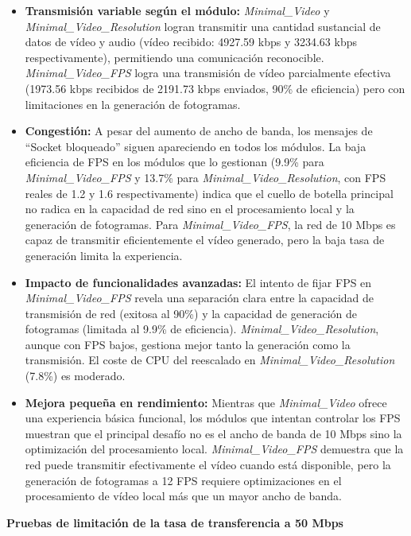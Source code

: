 \begin{itemize}
\item \textbf{Transmisión variable según el módulo:} \textit{Minimal\_Video} y \textit{Minimal\_Video\_Resolution} logran transmitir una cantidad sustancial de datos de vídeo y audio (vídeo recibido: 4927.59 kbps y 3234.63 kbps respectivamente), permitiendo una comunicación reconocible. \textit{Minimal\_Video\_FPS} logra una transmisión de vídeo parcialmente efectiva (1973.56 kbps recibidos de 2191.73 kbps enviados, 90\% de eficiencia) pero con limitaciones en la generación de fotogramas.
\item \textbf{Congestión:} A pesar del aumento de ancho de banda, los mensajes de ``Socket bloqueado'' siguen apareciendo en todos los módulos. La baja eficiencia de FPS en los módulos que lo gestionan (9.9\% para \textit{Minimal\_Video\_FPS} y 13.7\% para \textit{Minimal\_Video\_Resolution}, con FPS reales de 1.2 y 1.6 respectivamente) indica que el cuello de botella principal no radica en la capacidad de red sino en el procesamiento local y la generación de fotogramas. Para \textit{Minimal\_Video\_FPS}, la red de 10 Mbps es capaz de transmitir eficientemente el vídeo generado, pero la baja tasa de generación limita la experiencia.
\item \textbf{Impacto de funcionalidades avanzadas:} El intento de fijar FPS en \textit{Minimal\_Video\_FPS} revela una separación clara entre la capacidad de transmisión de red (exitosa al 90\%) y la capacidad de generación de fotogramas (limitada al 9.9\% de eficiencia). \textit{Minimal\_Video\_Resolution}, aunque con FPS bajos, gestiona mejor tanto la generación como la transmisión. El coste de CPU del reescalado en \textit{Minimal\_Video\_Resolution} (7.8\%) es moderado.
\item \textbf{Mejora pequeña en rendimiento:} Mientras que \textit{Minimal\_Video} ofrece una experiencia básica funcional, los módulos que intentan controlar los FPS muestran que el principal desafío no es el ancho de banda de 10 Mbps sino la optimización del procesamiento local. \textit{Minimal\_Video\_FPS} demuestra que la red puede transmitir efectivamente el vídeo cuando está disponible, pero la generación de fotogramas a 12 FPS requiere optimizaciones en el procesamiento de vídeo local más que un mayor ancho de banda.
\end{itemize}

\newpage

\textbf{Pruebas de limitación de la tasa de transferencia a 50 Mbps}
\vspace{\baselineskip}

